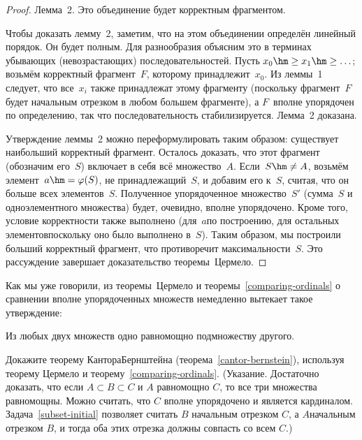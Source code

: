 \begin{proof}
\textsf{Лемма~2}. Это объединение будет корректным фрагментом.

Чтобы доказать лемму~2, заметим, что на этом объединении
определён линейный порядок. Он будет полным. Для разнообразия
объясним это в терминах убывающих (невозрастающих)
последовательностей. Пусть $x_0\hm\ge x_1\hm\ge \ldots$; возьмём
корректный фрагмент~$F$, которому принадлежит~$x_0$. Из леммы~1
следует, что все~$x_i$ также принадлежат этому фрагменту
(поскольку фрагмент~$F$ будет начальным отрезком в любом большем
фрагменте), а $F$~вполне упорядочен по определению, так что
последовательность стабилизируется. Лемма~2 доказана.

Утверждение леммы~2 можно переформулировать таким образом:
существует наибольший
корректный фрагмент. Осталось доказать, что этот фрагмент
(обозначим его~$S$) включает в себя всё множество~$A$.
Если~$S\hm\ne A$, возьмём элемент~$a\hm=\varphi(S)$, не принадлежащий~$S$,
и добавим его к~$S$, считая, что он больше всех
элементов~$S$. Полученное упорядоченное множество~$S'$
(сумма~$S$ и одноэлементного множества) будет, очевидно,
вполне упорядочено. Кроме того, условие корректности
также выполнено (для~$a$\т по построению, для остальных
элементов\т поскольку оно было выполнено в~$S$).
Таким образом, мы построили больший корректный фрагмент,
что противоречит максимальности~$S$. Это рассуждение
завершает доказательство теоремы~Цермело.
\end{proof}

Как мы уже говорили, из теоремы~Цермело и
теоремы~\ref{comparing-ordinals} о сравнении вполне
упорядоченных множеств
немедленно вытекает такое утверждение:

\begin{theorem}
        \label{zermelo-cardinals-comparing}
Из любых двух множеств одно равномощно подмножеству другого.
\end{theorem}

\begin{problem}
     \label{cantor-bernstein-alternative}
Докажите теорему Кантора\ч Бернштейна (теорема~\ref{cantor-bernstein}), используя теорему Цермело и теорему~\ref{comparing-ordinals}. (Указание. Достаточно доказать, что если $A\subset B\subset C$ и $A$ равномощно $C$, то все три множества равномощны. Можно считать, что $C$ вполне упорядочено и является кардиналом. Задача~\ref{subset-initial} позволяет считать $B$ начальным отрезком $C$, а $A$\т начальным отрезком $B$, и тогда оба этих отрезка должны совпасть со всем $C$.)
\end{problem}


